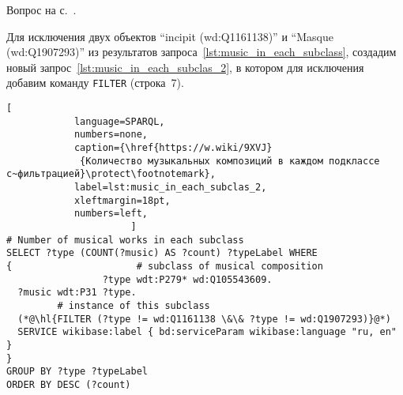 \hfil{}\hfil%
\begin{task}
    \label{answer:music_in_each_subclas_filter}
    \AnswerBackref Вопрос на с.~\pageref{question:music_comp}.
    
    Для исключения двух объектов ``incipit (wd:Q1161138)'' и ``Masque (wd:Q1907293)'' 
    из результатов запроса~\ref{lst:music_in_each_subclass}, 
    создадим новый запрос~\ref{lst:music_in_each_subclas_2}, в котором 
    для исключения добавим команду \lstinline|FILTER| (строка~7).
    \begin{lstlisting}[ 
            language=SPARQL, 
            numbers=none, 
            caption={\href{https://w.wiki/9XVJ}
		     {Количество музыкальных композиций в каждом подклассе с~фильтрацией}\protect\footnotemark}, 
            label=lst:music_in_each_subclas_2, 
            xleftmargin=18pt,
            numbers=left,
                      ]
# Number of musical works in each subclass
SELECT ?type (COUNT(?music) AS ?count) ?typeLabel WHERE 
{                      # subclass of musical composition
                 ?type wdt:P279* wd:Q105543609.      
  ?music wdt:P31 ?type.
         # instance of this subclass
  (*@\hl{FILTER (?type != wd:Q1161138 \&\& ?type != wd:Q1907293)}@*)
  SERVICE wikibase:label { bd:serviceParam wikibase:language "ru, en" }
}
GROUP BY ?type ?typeLabel
ORDER BY DESC (?count)
\end{lstlisting}
\end{task}




